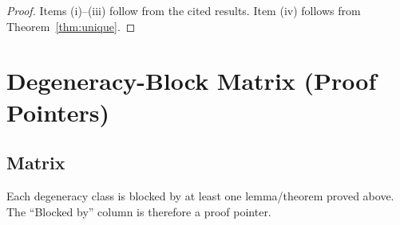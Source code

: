 \documentclass[12pt]{article}
\begin{document}
\begin{proof}
Items (i)--(iii) follow from the cited results. Item (iv) follows from Theorem~\ref{thm:unique}.
\end{proof}

\section{Degeneracy-Block Matrix (Proof Pointers)}
\label{sec:matrix}

\subsection{Matrix}
\label{subsec:matrix}

Each degeneracy class is blocked by at least one lemma/theorem proved above. The ``Blocked by'' column is therefore a proof pointer.
\end{document}
